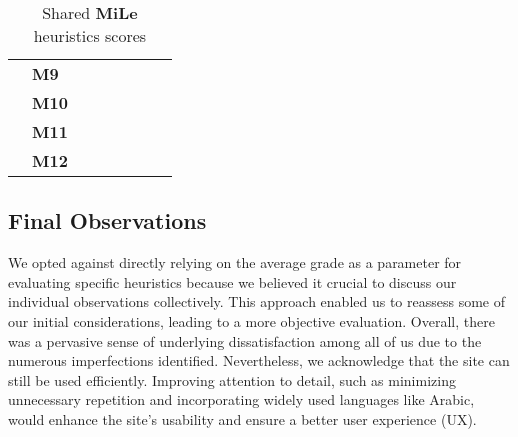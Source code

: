 \begin{table}[htp!]
\begin{tabular}{ |c|l|c|c|c|c|c|c| }
        \cline{2-8}
        & \textbf{M9} & \textbf{\color{unicefGreen}{4}} & \textbf{\color{unicefGreen}{4}} & \textbf{\color{unicefGreen}{4.5}} & \textbf{\color{unicefGreen}{5}} & \textbf{\color{unicefGreen}{4.375}} & \textbf{\color{unicefGreen}{4.5}}\\
        \cline{2-8}
        & \textbf{M10} & \textbf{\color{unicefGreen}{4}} & \textbf{\color{unicefOrange}{3}} & \textbf{\color{unicefGreen}{4.5}} & \textbf{\color{unicefGreen}{4}} & \textbf{\color{unicefOrange}{3.875}} & \textbf{\color{unicefGreen}{4}}\\
        \cline{2-8}
        & \textbf{M11} & \textbf{\color{unicefGreen}{4}} & \textbf{\color{unicefGreen}{4}} & \textbf{\color{unicefGreen}{4}} & \textbf{\color{unicefGreen}{4}} & \textbf{\color{unicefGreen}{4}} & \textbf{\color{unicefGreen}{4}}\\
        \cline{2-8}
        & \textbf{M12} & \textbf{\color{unicefGreen}{5}} & \textbf{\color{unicefGreen}{5}} & \textbf{\color{unicefGreen}{5}} & \textbf{\color{unicefGreen}{5}} & \textbf{\color{unicefGreen}{5}} & \textbf{\color{unicefGreen}{5}}\\
        \hline
    \end{tabular}
    \caption{Shared \textbf{MiLe} heuristics scores}
\end{table}
\newpage
\subsection{Final Observations}
We opted against directly relying on the average grade as a parameter for evaluating specific heuristics because we believed it crucial to discuss our individual observations collectively. 
This approach enabled us to reassess some of our initial considerations, leading to a more objective evaluation. 
Overall, there was a pervasive sense of underlying dissatisfaction among all of us due to the numerous imperfections identified. 
Nevertheless, we acknowledge that the site can still be used efficiently. 
Improving attention to detail, such as minimizing unnecessary repetition and incorporating widely used languages like Arabic, would enhance the site's usability and ensure a better user experience (UX).